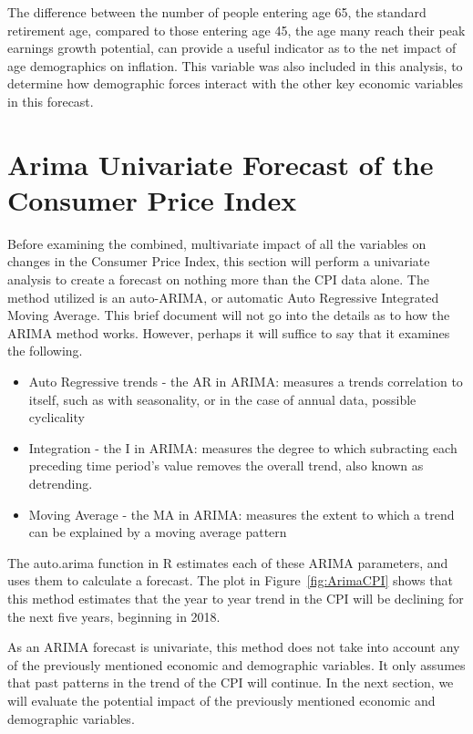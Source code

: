 \documentclass[12pt]{article}         %
\begin{document}
The difference between the number of people entering age 65, the standard retirement age, compared to those entering age 45, the age many reach their peak earnings growth potential, can provide a useful indicator as to the net impact of age demographics on inflation.  This variable was also included in this analysis, to determine how demographic forces interact with the other key economic variables in this forecast.


\section{Arima Univariate Forecast of the Consumer Price Index}

Before examining the combined, multivariate impact of all the variables on changes in the Consumer Price Index, this section will perform a univariate analysis to create a forecast on nothing more than the CPI data alone.  The method utilized is an auto-ARIMA, or automatic Auto Regressive Integrated Moving Average.  This brief document will not go into the details as to how the ARIMA method works.  However, perhaps it will suffice to say that it examines the following.

\begin{itemize}
\item Auto Regressive trends - the AR in ARIMA: measures a trends correlation to itself, such as with seasonality, or in the case of annual data, possible cyclicality
\item Integration - the I in ARIMA: measures the degree to which subracting each preceding time period's value removes the overall trend, also known as detrending.
\item Moving Average - the MA in ARIMA: measures the extent to which a trend can be explained by a moving average pattern
\end{itemize}

The auto.arima function in R estimates each of these ARIMA parameters, and uses them to calculate a forecast.  The plot in Figure~\ref{fig:ArimaCPI} shows that this method estimates that the year to year trend in the CPI will be declining for the next five years, beginning in 2018.  

As an ARIMA forecast is univariate, this method does not take into account any of the previously mentioned economic and demographic variables.  It only assumes that past patterns in the trend of the CPI will continue.  In the next section, we will evaluate the potential impact of the previously mentioned economic and demographic variables.
\end{document}
